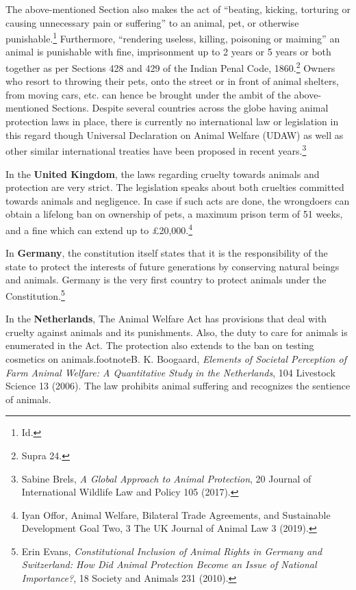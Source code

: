 \begin{multicols}{2}
\noi
The above-mentioned Section also makes the act of “beating, kicking, torturing or causing
unnecessary pain or suffering” to an animal, pet, or otherwise punishable.\footnote{Id.} Furthermore,
“rendering useless, killing, poisoning or maiming” an animal is punishable with fine,
imprisonment up to 2 years or 5 years or both together as per Sections 428 and 429 of the
Indian Penal Code, 1860.\footnote{Supra 24.} Owners who resort to throwing their pets, onto the street or in
front of animal shelters, from moving cars, etc. can hence be brought under the ambit of the
above-mentioned Sections. Despite several countries across the globe having animal
protection laws in place, there is currently no international law or legislation in this regard
though Universal Declaration on Animal Welfare (UDAW) as well as other similar
international treaties have been proposed in recent years.\footnote{Sabine Brels, \textit{A Global Approach to Animal Protection}, 20 Journal of International Wildlife Law and Policy 105 (2017).}


\noi
In the {\bf United Kingdom}, the laws regarding cruelty towards animals and protection are very
strict. The legislation speaks about both cruelties committed towards animals and negligence.
In case if such acts are done, the wrongdoers can obtain a lifelong ban on ownership of pets, a
maximum prison term of 51 weeks, and a fine which can extend up to £20,000.\footnote{Iyan Offor, Animal Welfare, Bilateral Trade Agreements, and Sustainable Development Goal Two, 3 The UK Journal of Animal Law 3 (2019).}

\noi
In {\bf Germany}, the constitution itself states that it is the responsibility of the state to protect the
interests of future generations by conserving natural beings and animals. Germany is the very
first country to protect animals under the Constitution.\footnote{Erin Evans, \textit{Constitutional Inclusion of Animal Rights in Germany and Switzerland: How Did Animal Protection Become an Issue of National Importance?}, 18 Society and Animals 231 (2010). }

\newpage

\noi
In the {\bf Netherlands}, The Animal Welfare Act has provisions that deal with cruelty against
animals and its punishments. Also, the duty to care for animals is enumerated in the Act. The
protection also extends to the ban on testing cosmetics on animals.footnote{B. K. Boogaard, \textit{Elements of Societal Perception of Farm Animal Welfare: A Quantitative Study in the Netherlands}, 104 Livestock Science 13 (2006).} The law prohibits animal
suffering and recognizes the sentience of animals. 



\end{multicols}
